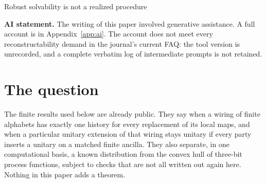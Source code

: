 \documentclass[12pt]{article}
\begin{document}
\begin{center}
{\Large Robust solvability is not a realized procedure\par}
\vspace{0.75em}
\end{center}

\begin{abstract}
A finite wiring can be robust in a precise procedural sense: the test that asks whether a tuple of local maps has a unique history returns the same kind of answer, namely exactly one history, for every tuple. A further theorem says that the same condition is necessary and sufficient for a canonical closed loop to stay unitary under every local unitary and every matched finite ancilla. That is still a fact about a procedure defined on the wiring. It is not the convergence of independent detections of a phenomenon, and it is not evidence that a physical system implements the procedure. The second gap is the one Karaca marks between the robustness of a procedure and the robustness of a system that would have to carry it out. A bare reversible relabeling exists for wirings that fail the test. A finite search can decide the test for an explicit table and is a different procedure. A known distribution, read in one basis from a known board, falls outside the convex hull of three-bit process functions if an external enumeration is granted; that calculation is not an experiment. The mathematics is an alternative adaptation of results already public. It is not offered as an independent study, and it does not transfer the warrant of one robustness notion to another.
\end{abstract}

\noindent\textbf{AI statement.} The writing of this paper involved generative assistance. A full account is in Appendix~\ref{app:ai}. The account does not meet every reconstructability demand in the journal's current FAQ: the tool version is unrecorded, and a complete verbatim log of intermediate prompts is not retained.

\section{The question}
\label{sec:q}

The finite results used below are already public. They say when a wiring of finite alphabets has exactly one history for every replacement of its local maps, and when a particular unitary extension of that wiring stays unitary if every party inserts a unitary on a matched finite ancilla. They also separate, in one computational basis, a known distribution from the convex hull of three-bit process functions, subject to checks that are not all written out again here. Nothing in this paper adds a theorem.
\end{document}
